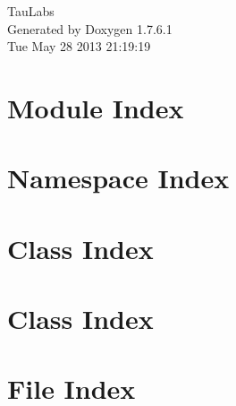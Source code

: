 \documentclass[a4paper]{book}
\begin{document}
\hypersetup{pageanchor=false,citecolor=blue}
\begin{titlepage}
\vspace*{7cm}
\begin{center}
{\Large \-Tau\-Labs }\\
\vspace*{1cm}
{\large \-Generated by Doxygen 1.7.6.1}\\
\vspace*{0.5cm}
{\small Tue May 28 2013 21:19:19}\\
\end{center}
\end{titlepage}
\clearemptydoublepage
{}
\tableofcontents
\clearemptydoublepage
{}
\hypersetup{pageanchor=true,citecolor=blue}
\chapter{\-Module \-Index}

\chapter{\-Namespace \-Index}

\chapter{\-Class \-Index}

\chapter{\-Class \-Index}

\chapter{\-File \-Index}

\end{document}
